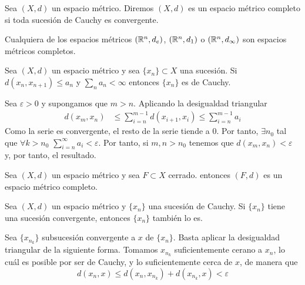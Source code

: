 \documentclass[FyPI.tex]{subfiles}
\begin{document}
\begin{defi}
Sea $(X,d)$ un espacio métrico. Diremos $(X,d)$ es un espacio métrico completo si toda sucesión de Cauchy es convergente.
\end{defi}
\begin{theorem}
Cualquiera de los espacios métricos $(\mathbb{R}^n,d_e)$, $(\mathbb{R}^n,d_1)$ o $(\mathbb{R}^n,d_\infty)$  son espacios métricos completos.
\end{theorem}
\begin{lema}
Sea $(X,d)$ un espacio métrico y sea $\{x_n\} \subset X$ una sucesión. Si $d(x_n,x_{n+1})\leq a_n$ y $\sum_n a_n < \infty$ entonces $\{x_n\}$ es de Cauchy.
\end{lema}
\begin{dem}
Sea $\varepsilon >0$ y supongamos que $m>n$. Aplicando la desigualdad triangular
\begin{align*}
d(x_m,x_n) &\leq \sum_{i=n}^{m-1} d(x_{i+1},x_i)\leq \sum_{i=n}^{m-1} a_i 
\end{align*}
Como la serie es convergente, el resto de la serie tiende a $0$. Por tanto, $\exists n_0$ tal que $\forall k> n_0$ $\sum_{i=n}^\infty a_i < \varepsilon$. Por tanto, si $m,n>n_0$ tenemos que $d(x_m,x_n)<\varepsilon$ y, por tanto, el resultado.
\end{dem}
\begin{ejer}
Sea $(X,d)$ un espacio métrico y sea $F\subset X$ cerrado. entonces $(F,d)$ es un espacio métrico completo.
\end{ejer}
\begin{lema}
Sea $(X,d)$ un espacio métrico y $\{x_n\}$ una sucesión de Cauchy. Si $\{x_n\}$ tiene una sucesión convergente, entonces $\{x_n\}$ también lo es.
\end{lema}
\begin{dem}
Sea $\{x_{n_k}\}$ subsucesión convergente a $x$ de $\{x_n\}$. Basta aplicar la desigualdad triangular de la siguiente forma. Tomamos $x_{n_k}$ suficientemente cerano a $x_n$, lo cuál es posible por ser de Cauchy, y lo suficientemente cerca de $x$, de manera que 
$$
d(x_n,x) \leq d(x_n,x_{n_k}) + d(x_{n_k},x) < \varepsilon
$$
\end{dem}
\end{document}

